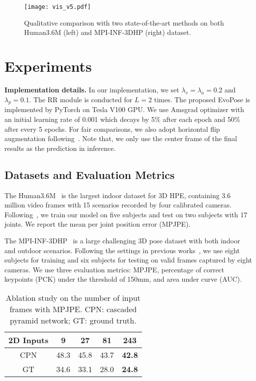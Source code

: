 \documentclass{article}
\begin{document}
\begin{figure*}[t]
  \setlength{\abovecaptionskip}{0cm}
  \setlength{\belowcaptionskip}{-0.2cm}
\centering
  \centerline{\texttt{[image: vis\_v5.pdf]}}
\caption{Qualitative comparison with two state-of-the-art methods on both Human3.6M (left) and MPI-INF-3DHP (right) dataset.}
\label{fig:vis}
\end{figure*}

\section{Experiments}\label{sec:experiments}
{\bf Implementation details.} 
In our implementation, we set $\lambda_v = \lambda_a = 0.2$ and $\lambda_p = 0.1$.  The RR module is conducted for $L=2$ times. The proposed EvoPose is implemented by PyTorch on Tesla V100 GPU. We use Amsgrad optimizer with an initial learning rate of 0.001 which decays by 5\% after each epoch and 50\% after every 5 epochs. 
For fair comparisons, we also adopt horizontal flip augmentation following~\cite{zheng20213d,pavllo20193d,chen2021anatomy}. Note that, we only use the center frame of the final results as the prediction in inference.

\subsection{Datasets and Evaluation Metrics} The Human3.6M~\cite{h36m_pami} is the largest indoor dataset for 3D HPE, containing 3.6 million video frames with 15 scenarios recorded by four calibrated cameras. Following~\cite{chen2021anatomy,zheng20213d,li2022mhformer,shan2022p}, we train our model on five subjects and test on two subjects with 17 joints. We report the mean per joint position error (MPJPE).

 The MPI-INF-3DHP~\cite{mono-3dhp2017} is a large challenging 3D pose dataset with both indoor and outdoor scenarios. Following the settings in previous works~\cite{zheng20213d,li2022mhformer,shan2022p}, we use eight subjects for training and six subjects for testing on valid frames captured by eight cameras. We use three evaluation metrics: MPJPE, percentage of correct keypoints (PCK) under the threshold of 150mm, and area under curve (AUC).

\begin{table}[t]\footnotesize
    \setlength{\abovecaptionskip}{0cm}
    \setlength{\belowcaptionskip}{-0.3cm}
    \caption{Ablation study on the number of input frames with MPJPE. CPN: cascaded pyramid network; GT: ground truth.}
    \label{tab:receptive}
    \centering
    \begin{tabular}{ccccc}
        \toprule
        2D Inputs & 9 & 27 & 81 & 243 \\
        \midrule
        CPN & 48.3 & 45.8 & 43.7 & {\bf 42.8} \\
        GT & 34.6 & 33.1 & 28.0 & {\bf 24.8} \\
        \bottomrule
    \end{tabular}
\end{table}
\end{document}
